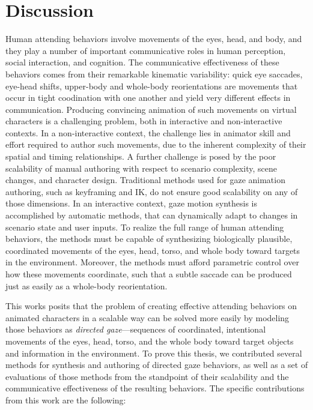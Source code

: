 \pagestyle{deposit}

\chapter{Discussion}
\label{cha:Discussion}

Human attending behaviors involve movements of the eyes, head, and body, and they play a number of important communicative roles in human perception, social interaction, and cognition. The communicative effectiveness of these behaviors comes from their remarkable kinematic variability: quick eye saccades, eye-head shifts, upper-body and whole-body reorientations are movements that occur in tight coodination with one another and yield very different effects in communication. Producing convincing animation of such movements on virtual characters is a challenging problem, both in interactive and non-interactive contexts. In a non-interactive context, the challenge lies in animator skill and effort required to author such movements, due to the inherent complexity of their spatial and timing relationships. A further challenge is posed by the poor scalability of manual authoring with respect to scenario complexity, scene changes, and character design. Traditional methods used for gaze animation authoring, such as keyframing and IK, do not ensure good scalability on any of those dimensions. In an interactive context, gaze motion synthesis is accomplished by automatic methods, that can dynamically adapt to changes in scenario state and user inputs. To realize the full range of human attending behaviors, the methods must be capable of synthesizing biologically plausible, coordinated movements of the eyes, head, torso, and whole body toward targets in the environment. Moreover, the methods must afford parametric control over how these movements coordinate, such that a subtle saccade can be produced just as easily as a whole-body reorientation.

This works posits that the problem of creating effective attending behaviors on animated characters in a scalable way can be solved more easily by modeling those behaviors as \emph{directed gaze}---sequences of coordinated, intentional movements of the eyes, head, torso, and the whole body toward target objects and information in the environment. To prove this thesis, we contributed several methods for synthesis and authoring of directed gaze behaviors, as well as a set of evaluations of those methods from the standpoint of their scalability and the communicative effectiveness of the resulting behaviors. The specific contributions from this work are the following:

